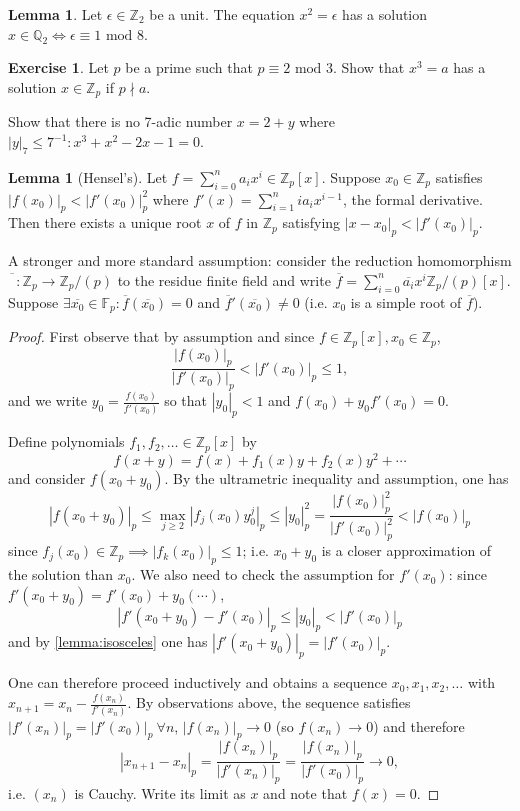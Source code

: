 \documentclass{article}
\newcommand{\F}{\mathbb{F}}
\newcommand{\Z}{\mathbb{Z}}
\newcommand{\Q}{\mathbb{Q}}
\newcommand{\Mod}{\text{ mod }}
\theoremstyle{definition}
\newtheorem{lemma}[defn]{Lemma}
\newtheorem{exe}[defn]{Exercise}
\begin{document}
\begin{lemma}
\label{lemma:squaresinQ2}
Let $\epsilon\in\Z_2$ be a unit. The equation $x^2=\epsilon$ has a solution $x\in\Q_2 \iff \epsilon\equiv 1\Mod 8$.
\end{lemma}

\begin{exe}
Let $p$ be a prime such that $p\equiv 2\Mod 3$. Show that $x^3=a$ has a solution $x\in\Z_p$ if $p\nmid a$.

Show that there is no 7-adic number $x=2+y$ where $|y|_7\leq 7^{-1}:x^3+x^2-2x-1=0$.
\end{exe}

\begin{lemma}[Hensel's]
\label{lemma:Hensel}
Let $f=\sum_{i=0}^n a_i x^i\in\Z_p[x]$. Suppose $x_0\in\Z_p$ satisfies $|f(x_0)|_p<|f'(x_0)|_p^2$ where $f'(x)=\sum_{i=1}^n ia_i x^{i-1}$, the formal derivative. Then there exists a unique root $x$ of $f$ in $\Z_p$ satisfying $|x-x_0|_p<|f'(x_0)|_p$.

A stronger and more standard assumption: consider the reduction homomorphism $\overline{\phantom{\phi}}:\Z_p\rightarrow\Z_p/(p)$ to the residue finite field and write $\overline f=\sum_{i=0}^n \overline{a_i}x^i\Z_p/(p)[x]$. Suppose $\exists\overline{x_0}\in\F_p:\overline f(\overline{x_0})=0$ and $\overline{f}'(\overline{x_0})\neq 0$ (i.e. $x_0$ is a simple root of $\overline f$).
\end{lemma}

\begin{proof}
First observe that by assumption and since $f\in\Z_p[x],x_0\in\Z_p$,
\[
\frac{|f(x_0)|_p}{|f'(x_0)|_p}< |f'(x_0)|_p\leq 1,
\]
and we write $y_0=\frac{f(x_0)}{f'(x_0)}$ so that $|y_0|_p<1$ and $f(x_0)+y_0f'(x_0)=0$.

Define polynomials $f_1,f_2,\ldots\in\Z_p[x]$ by
\[
f(x+y)=f(x)+f_1(x)y+f_2(x)y^2+\cdots
\]
and consider $f(x_0+y_0)$. By the ultrametric inequality and assumption, one has
\[
|f(x_0+y_0)|_p\leq\max_{j\geq 2} \left|f_j(x_0)y_0^j\right|_p\leq |y_0|_p^2=\frac{|f(x_0)|_p^2}{|f'(x_0)|_p^2}<|f(x_0)|_p
\]
since $f_j(x_0)\in\Z_p\implies |f_k(x_0)|_p\leq 1$; i.e. $x_0+y_0$ is a closer approximation of the solution than $x_0$. We also need to check the assumption for $f'(x_0)$: since $f'(x_0+y_0)=f'(x_0)+y_0(\cdots)$,
\[
|f'(x_0+y_0)-f'(x_0)|_p\leq |y_0|_p<|f'(x_0)|_p
\]
and by \ref{lemma:isosceles} one has $|f'(x_0+y_0)|_p=|f'(x_0)|_p$.

One can therefore proceed inductively and obtains a sequence $x_0,x_1,x_2,\ldots$ with $x_{n+1}=x_n-\frac{f(x_n)}{f'(x_n)}$. By observations above, the sequence satisfies $|f'(x_n)|_p=|f'(x_0)|_p \ \forall n$, $|f(x_n)|_p\rightarrow 0$ (so $f(x_n)\rightarrow 0$) and therefore
\[
|x_{n+1}-x_n|_p=\frac{|f(x_n)|_p}{|f'(x_n)|_p}=\frac{|f(x_n)|_p}{|f'(x_0)|_p}\rightarrow 0,
\]
i.e. $(x_n)$ is Cauchy. Write its limit as $x$ and note that $f(x)=0$.
\end{proof}
\end{document}
